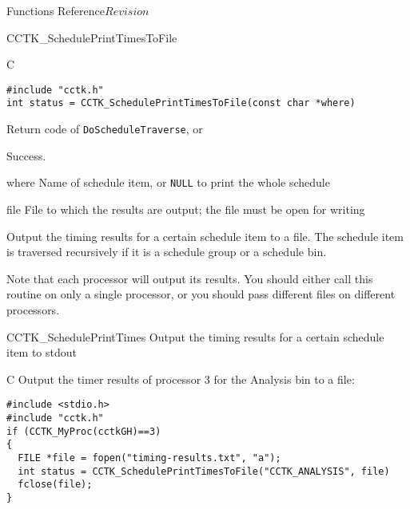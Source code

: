 \begin{cactuspart}{ Functions Reference}{}{$Revision$}
\begin{FunctionDescription}{CCTK\_SchedulePrintTimesToFile}
  \begin{SynopsisSection}
    \begin{Synopsis}{C}
\begin{verbatim}
#include "cctk.h"
int status = CCTK_SchedulePrintTimesToFile(const char *where)
\end{verbatim}
    \end{Synopsis}
  \end{SynopsisSection}
  
  \begin{ResultSection}
    \begin{ResultNote}
      Return code of \texttt{DoScheduleTraverse}, or
    \end{ResultNote}
    \begin{Result}{0}
      Success.
    \end{Result}
  \end{ResultSection}
  
  \begin{ParameterSection}
    \begin{Parameter}{where}
      Name of schedule item, or \texttt{NULL} to print the whole
      schedule
    \end{Parameter}
    \begin{Parameter}{file}
      File to which the results are output; the file must be open for
      writing
    \end{Parameter}
  \end{ParameterSection}
  
  \begin{Discussion}
    Output the timing results for a certain schedule item to a file.
    The schedule item is traversed recursively if it is a schedule
    group or a schedule bin.
    
    Note that each processor will output its results.  You should
    either call this routine on only a single processor, or you should
    pass different files on different processors.
  \end{Discussion}
  
  \begin{SeeAlsoSection}
    \begin{SeeAlso}{CCTK\_SchedulePrintTimes}
      Output the timing results for a certain schedule item to stdout
    \end{SeeAlso}
  \end{SeeAlsoSection}

  \begin{ExampleSection}
    \begin{Example}{C}
      Output the timer results of processor 3 for the Analysis bin to
      a file:
\begin{verbatim}
#include <stdio.h>
#include "cctk.h"
if (CCTK_MyProc(cctkGH)==3)
{
  FILE *file = fopen("timing-results.txt", "a");
  int status = CCTK_SchedulePrintTimesToFile("CCTK_ANALYSIS", file)
  fclose(file);
}
\end{verbatim}
\end{Example}
  \end{ExampleSection}
  

\end{FunctionDescription}
\end{cactuspart}
